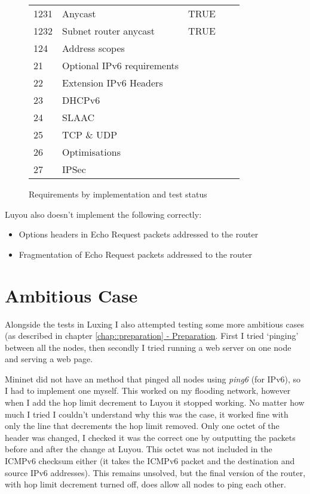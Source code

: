 \documentclass[12pt,a4paper,twoside,openany]{report}
\begin{document}
\begin{figure}
\begin{tabular}{lllll}
1231       & Anycast                     & TRUE    &             &            \\
1232       & Subnet router anycast       & TRUE    &             &            \\
124        & Address scopes              &         &             &            \\
21         & Optional IPv6 requirements              &         &             &            \\
22         & Extension IPv6 Headers           &         &             &            \\
23         & DHCPv6                      &         &             &            \\
24         & SLAAC                       &         &             &            \\
25         & TCP \& UDP                   &         &             &            \\
26         & Optimisations                &         &             &            \\
27         & IPSec                       &         &             &           
\end{tabular}
\caption{Requirements by implementation and test status}
\label{fig::test_status}
\end{figure}

\bigskip

Luyou also doesn't implement the following correctly:
\begin{itemize}
\item Options headers in Echo Request packets addressed to the router
\item Fragmentation of Echo Request packets addressed to the router
\end{itemize}


\section{Ambitious Case}

Alongside the tests in Luxing I also attempted testing some more ambitious cases (as described in chapter \ref{chap::preparation}\hyperref[chap::preparation]{ - Preparation}.  First I tried `pinging' between all the nodes, then secondly I tried running a web server on one node and serving a web page.

\bigskip

Mininet did not have an method that pinged all nodes using \textit{ping6} (for IPv6), so I had to implement one myself.  This worked on my flooding network, however when I add the hop limit decrement to Luyou it stopped working. No matter how much I tried I couldn't understand why this was the case, it worked fine with only the line that decrements the hop limit removed. Only one octet of the header was changed, I checked it was the correct one by outputting the packets before and after the change at Luyou.  This octet was not included in the ICMPv6 checksum either (it takes the ICMPv6 packet and the destination and source IPv6 addresses).  This remains unsolved, but the final version of the router, with hop limit decrement turned off, does allow all nodes to ping each other.
\end{document}
